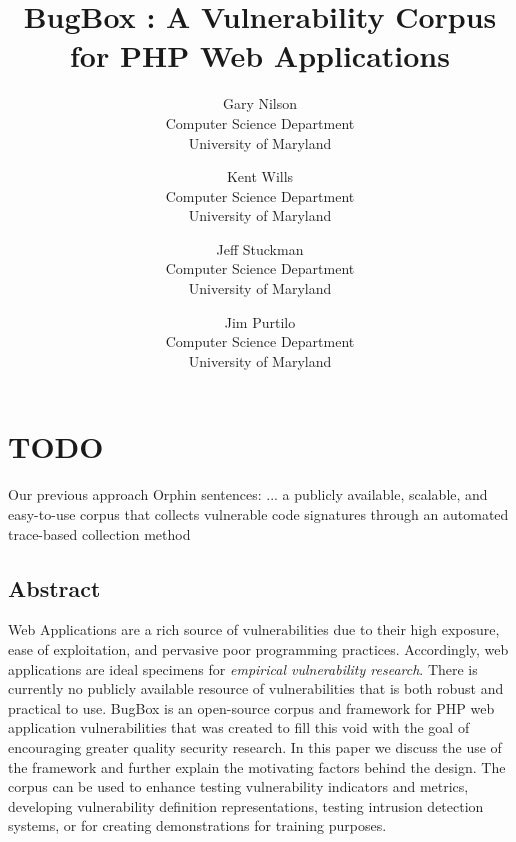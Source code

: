 \documentclass[letterpaper,twocolumn,10pt]{article}
\begin{document}
\date{}


\title{\Large \bf BugBox : A Vulnerability Corpus for PHP Web Applications}


\author{
{\rm Gary Nilson}\\
Computer Science Department\\University of Maryland
\and
{\rm Kent Wills}\\
Computer Science Department\\University of Maryland
\and
{\rm Jeff Stuckman}\\
Computer Science Department\\University of Maryland
\and
{\rm Jim Purtilo}\\
Computer Science Department\\University of Maryland
} %

\maketitle

\thispagestyle{empty}

\section{TODO}
Our previous approach
Orphin sentences:
... a publicly available, scalable, and easy-to-use corpus that collects vulnerable code signatures through an automated trace-based collection method


\subsection*{Abstract}
Web Applications are a rich source of vulnerabilities due to their high exposure, ease of exploitation, and pervasive poor programming practices. Accordingly, web applications are ideal specimens for \emph{empirical vulnerability research}. There is currently no publicly available resource of vulnerabilities that is both robust and practical to use. BugBox is an open-source corpus and framework for PHP web application vulnerabilities that was created to fill this void with the goal of encouraging greater quality security research. In this paper we discuss the use of the framework and further explain the motivating factors behind the design. The corpus can be used to enhance testing vulnerability indicators and metrics, developing vulnerability definition representations, testing intrusion detection systems, or for creating demonstrations for training purposes.  
\end{document}
